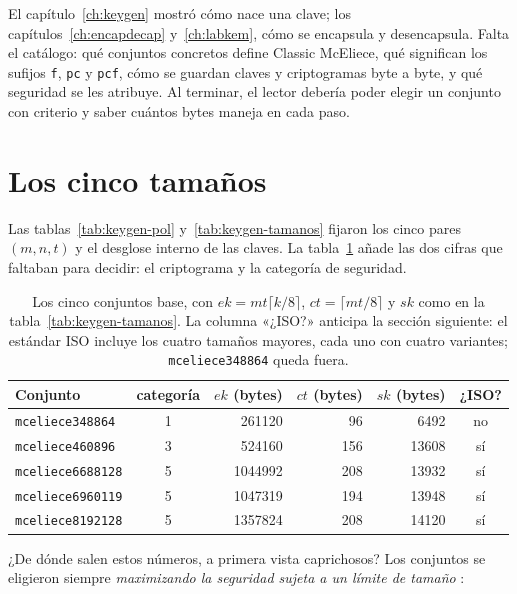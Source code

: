 \documentclass[11pt,a4paper,oneside]{report}
\begin{document}
\begin{roadmap}
El capítulo~\ref{ch:keygen} mostró cómo nace una clave; los
capítulos~\ref{ch:encapdecap} y~\ref{ch:labkem}, cómo se encapsula y
desencapsula. Falta el catálogo: qué conjuntos concretos define Classic
McEliece, qué significan los sufijos \texttt{f}, \texttt{pc} y
\texttt{pcf}, cómo se guardan claves y criptogramas byte a byte, y qué
seguridad se les atribuye. Al terminar, el lector debería poder elegir
un conjunto con criterio y saber cuántos bytes maneja en cada paso.
\end{roadmap}

\section{Los cinco tamaños}\label{sec:param-cinco}

Las tablas~\ref{tab:keygen-pol} y~\ref{tab:keygen-tamanos} fijaron los
cinco pares $(m,n,t)$ y el desglose interno de las claves. La
tabla~\ref{tab:param-base} añade las dos cifras que faltaban para
decidir: el criptograma y la categoría de seguridad.

\begin{table}[htbp]
\centering
\small
\setlength{\tabcolsep}{7pt}
\begin{tabular}{lcrrrc}
\toprule
Conjunto & categoría & $ek$ (bytes) & $ct$ (bytes) & $sk$ (bytes) & ¿ISO?\\
\midrule
\texttt{mceliece348864} & 1 & \num{261120}  & 96  & \num{6492}  & no\\
\texttt{mceliece460896} & 3 & \num{524160}  & 156 & \num{13608} & sí\\
\texttt{mceliece6688128} & 5 & \num{1044992} & 208 & \num{13932} & sí\\
\texttt{mceliece6960119} & 5 & \num{1047319} & 194 & \num{13948} & sí\\
\texttt{mceliece8192128} & 5 & \num{1357824} & 208 & \num{14120} & sí\\
\bottomrule
\end{tabular}
\caption{Los cinco conjuntos base, con
$ek=mt\lceil k/8\rceil$, $ct=\lceil mt/8\rceil$ y $sk$ como en la
tabla~\ref{tab:keygen-tamanos}. La columna «¿ISO?» anticipa la
sección siguiente: el estándar ISO incluye los cuatro tamaños
mayores, cada uno con cuatro variantes; \texttt{mceliece348864} queda
fuera.}\label{tab:param-base}
\end{table}

¿De dónde salen estos números, a primera vista caprichosos? Los
conjuntos se eligieron siempre \emph{maximizando la seguridad sujeta a
un límite de tamaño} \cite{cmrationale}:
\end{document}
